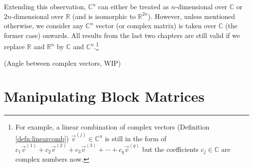 Extending this observation, $\mathbb{C}^n$ can either be treated as $n$-dimensional over $\mathbb{C}$ or $2n$-dimensional over $\mathbb{R}$ (and is isomorphic to $\mathbb{R}^{2n}$). However, unless mentioned otherwise, we consider any $\mathbb{C}^n$ vector (or complex matrix) is taken over $\mathbb{C}$ (the former case) onwards. All results from the last two chapters are still valid if we replace $\mathbb{R}$ and $\mathbb{R}^n$ by $\mathbb{C}$ and $\mathbb{C}^n$.\footnote{For example, a linear combination of complex vectors (Definition \ref{defn:linearcomb}) $\vec{v}^{(j)} \in \mathbb{C}^n$ is still in the form of $c_1\vec{v}^{(1)} + c_2\vec{v}^{(2)} + c_3\vec{v}^{(3)} + \cdots + c_q\vec{v}^{(q)}$ but the coefficients $c_j \in \mathbb{C}$ are complex numbers now.}

\begin{proper}
(Angle between complex vectors, WIP)
\end{proper}

\section{Manipulating Block Matrices}

